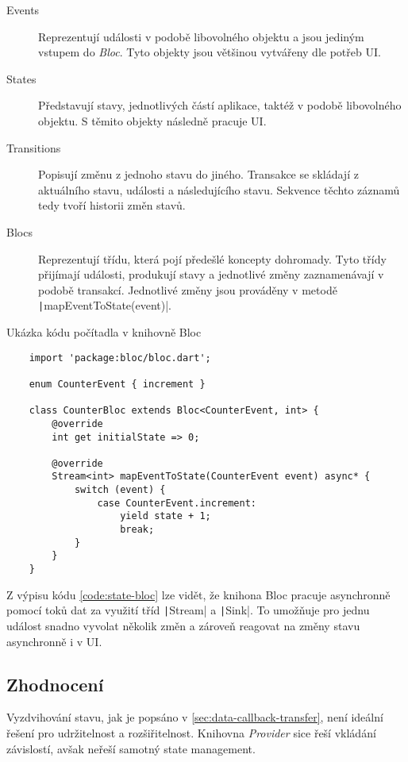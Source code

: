 \begin{description}
    \item[Events] Reprezentují události v podobě libovolného objektu
    a jsou jediným vstupem do \emph{Bloc}.
    Tyto objekty jsou většinou vytvářeny dle potřeb UI.
    \item[States] Představují stavy,
    jednotlivých částí aplikace,
    taktéž v podobě libovolného objektu.
    S těmito objekty následně pracuje UI.
    \item[Transitions] Popisují změnu z jednoho stavu do jiného.
    Transakce se skládají z aktuálního stavu, události a následujícího stavu.
    Sekvence těchto záznamů tedy tvoří historii změn stavů.
    \item[Blocs] Reprezentují třídu,
    která pojí předešlé koncepty dohromady.
    Tyto třídy přijímají události, produkují stavy a jednotlivé změny
    zaznamenávají v podobě transakcí.
    Jednotlivé změny jsou prováděny v metodě
    \texttt|mapEventToState(event)|.
\end{description}

\begin{listing}
    \caption{Ukázka kódu počítadla v knihovně Bloc}
    \label{code:state-bloc}
    \begin{verbatim}
    import 'package:bloc/bloc.dart';

    enum CounterEvent { increment }
    
    class CounterBloc extends Bloc<CounterEvent, int> {
        @override
        int get initialState => 0;
    
        @override
        Stream<int> mapEventToState(CounterEvent event) async* {
            switch (event) {
                case CounterEvent.increment:
                    yield state + 1;
                    break;
            }
        }
    }
    \end{verbatim}
\end{listing}

Z výpisu kódu \ref{code:state-bloc} lze vidět,
že knihona Bloc pracuje asynchronně pomocí toků dat za využití
tříd \texttt|Stream| a \texttt|Sink|.
To umožňuje pro jednu událost snadno vyvolat několik změn
a zároveň reagovat na změny stavu asynchronně i v UI.

\subsection{Zhodnocení}

Vyzdvihování stavu,
jak je popsáno v \ref{sec:data-callback-transfer},
není ideální řešení pro udržitelnost a rozšiřitelnost.
Knihovna \emph{Provider} sice řeší vkládání závislostí,
avšak neřeší samotný state management.

